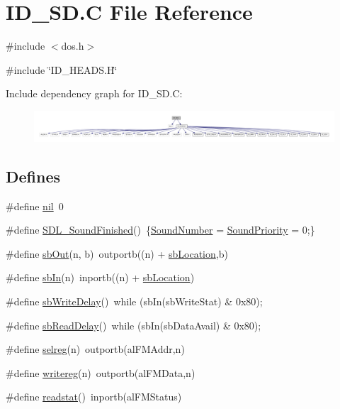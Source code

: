 \hypertarget{ID__SD_8C}{
\section{ID\_\-SD.C File Reference}
\label{ID__SD_8C}
}
{\ttfamily \#include $<$dos.h$>$}\par
{\ttfamily \#include \char`\"{}ID\_\-HEADS.H\char`\"{}}\par
Include dependency graph for ID\_\-SD.C:
\nopagebreak
\begin{figure}[H]
\begin{center}
\leavevmode
\includegraphics[width=400pt]{ID__SD_8C__incl}
\end{center}
\end{figure}
\subsection*{Defines}
\begin{DoxyCompactItemize}
\item 
\#define \hyperlink{ID__SD_8C_a7a7ca81d2a85873283b5ec82953b1b25}{nil}~0
\item 
\#define \hyperlink{ID__SD_8C_a4367e91effb7508f98e4215dfae889ea}{SDL\_\-SoundFinished}()~\{\hyperlink{ID__SD_8C_a4c4aa04b74e9aeb63645d0b371d03f8e}{SoundNumber} = \hyperlink{ID__SD_8C_a1082f4d01ae4202540aa8c9d40ab1208}{SoundPriority} = 0;\}
\item 
\#define \hyperlink{ID__SD_8C_af7f3607b9b02c650b7a022e37f8d19b0}{sbOut}(n, b)~outportb((n) + \hyperlink{ID__SD_8C_ad1041dc24d08c7fc215c300fe99c1609}{sbLocation},b)
\item 
\#define \hyperlink{ID__SD_8C_a3cf283ea5ef38cf11674cd9f7194e788}{sbIn}(n)~inportb((n) + \hyperlink{ID__SD_8C_ad1041dc24d08c7fc215c300fe99c1609}{sbLocation})
\item 
\#define \hyperlink{ID__SD_8C_a0a9efa68dd24d3e096da052c1e2886ac}{sbWriteDelay}()~while (sbIn(sbWriteStat) \& 0x80);
\item 
\#define \hyperlink{ID__SD_8C_a7c872881433badd3687f00851c8e9dab}{sbReadDelay}()~while (sbIn(sbDataAvail) \& 0x80);
\item 
\#define \hyperlink{ID__SD_8C_a15e6bd6af7db2d02d00d7a4fc4cbbf1c}{selreg}(n)~outportb(alFMAddr,n)
\item 
\#define \hyperlink{ID__SD_8C_a57d191c14b6c2be5bcf48210f997fe91}{writereg}(n)~outportb(alFMData,n)
\item 
\#define \hyperlink{ID__SD_8C_a467b4ec8e11cd774be73526dda0fd1d0}{readstat}()~inportb(alFMStatus)
\end{DoxyCompactItemize}
